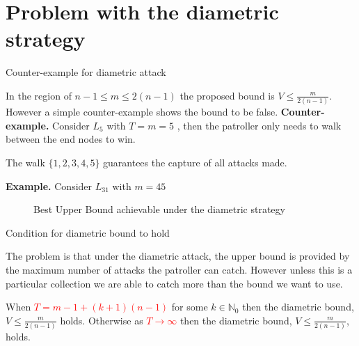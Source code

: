 \documentclass[11pt]{beamer}
\begin{document}
\section[]{Problem with the diametric strategy}
\hypertarget{Problem with diametric strategy}{}
\begin{frame}{Counter-example for diametric attack}

In the region of $n-1 \leq m \leq 2(n-1)$ the proposed bound is $V \leq \frac{m}{2(n-1)}$. However a simple counter-example shows the bound to be false.
\newline
\newline
\textbf{Counter-example.}
Consider $L_{5}$ with $T=m=5$ , then the patroller only needs to walk between the end nodes to win.
\begin{center}
\end{center}
The walk $\{ 1,2,3,4,5 \}$ guarantees the capture of all attacks made.

\end{frame}

\begin{frame}{\insertsection}

\textbf{Example.}
Consider $L_{31}$ with $m=45$

\begin{figure}
\resizebox{0.95\linewidth}{!}{
}
\caption{Best Upper Bound achievable under the diametric strategy}
\end{figure}

\end{frame}

\begin{frame}{Condition for diametric bound to hold}

The problem is that under the diametric attack, the upper bound is provided by the maximum number of attacks the patroller can catch. However unless this is a particular collection we are able to catch more than the bound we want to use.

\begin{lemma}
When \textcolor{red}{$T=m-1+(k+1)(n-1)$} for some $k \in \mathbb{N}_{0}$ then the diametric bound, $V \leq \frac{m}{2(n-1)}$ holds. Otherwise as \textcolor{red}{$T \rightarrow \infty$} then the diametric bound, $V \leq \frac{m}{2(n-1)}$, holds.
\end{lemma}

\end{frame}
\end{document}
